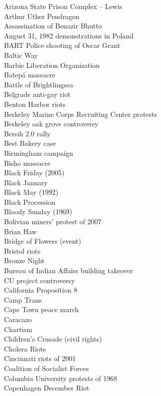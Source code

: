 Arizona State Prison Complex – Lewis\\
Arthur Uther Pendragon\\
Assassination of Benazir Bhutto\\
August 31, 1982 demonstrations in Poland\\
BART Police shooting of Oscar Grant\\
Baltic Way\\
Barbie Liberation Organization\\
Batepá massacre\\
Battle of Brightlingsea\\
Belgrade anti-gay riot\\
Benton Harbor riots\\
Berkeley Marine Corps Recruiting Center protests\\
Berkeley oak grove controversy\\
Bersih 2.0 rally\\
Best Bakery case\\
Birmingham campaign\\
Bisho massacre\\
Black Friday (2005)\\
Black January\\
Black May (1992)\\
Black Procession\\
Bloody Sunday (1969)\\
Bolivian miners' protest of 2007\\
Brian Haw\\
Bridge of Flowers (event)\\
Bristol riots\\
Bronze Night\\
Bureau of Indian Affairs building takeover\\
CU project controversy\\
California Proposition 8\\
Camp Trans\\
Cape Town peace march\\
Caracazo\\
Chartism\\
Children's Crusade (civil rights)\\
Cholera Riots\\
Cincinnati riots of 2001\\
Coalition of Socialist Forces\\
Columbia University protests of 1968\\
Copenhagen December Riot\\
